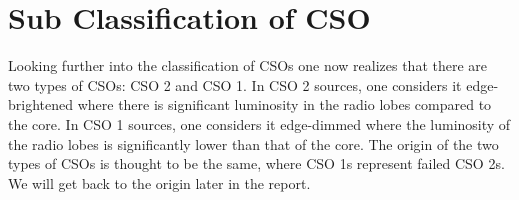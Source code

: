 








\section{Sub Classification of CSO}
Looking further into the classification of CSOs one now realizes that there are two types of CSOs: CSO 2 and CSO 1. In CSO 2 sources, one considers it edge-brightened where there is significant luminosity in the radio lobes compared to the core. In CSO 1 sources, one considers it edge-dimmed where the luminosity of the radio lobes is significantly lower than that of the core. The origin of the two types of CSOs is thought to be the same, where CSO 1s represent failed CSO 2s. We will get back to the origin later in the report.

